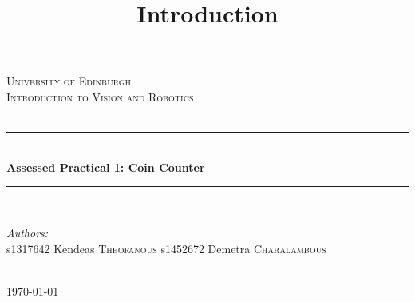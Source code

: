 \documentclass[11pt]{article}
\begin{document}
\begin{titlepage}

\newcommand{\HRule}{\rule{\linewidth}{0.5mm}} %

\center %
 

\textsc{\LARGE University of Edinburgh}\\[1.5cm] %
\textsc{\Large Introduction to Vision and Robotics}\\[0.5cm] %
\textsc{\large }\\[0.5cm] %


\HRule \\[0.4cm]
{ \huge \bfseries Assessed Practical 1: Coin Counter}\\[0.4cm] %
\HRule \\[1.5cm]
 

\begin{minipage}{0.5\textwidth}
\begin{flushleft} \large
\emph{Authors:}\\
s1317642 Kendeas \textsc{Theofanous}
s1452672 Demetra \textsc{Charalambous}
\end{flushleft}
\end{minipage}\\[3cm]

{\large \today}\\[3cm]

\end{titlepage}

\newpage

\title{Introduction} \setlength{\droptitle}{-70pt}
\date{\vspace{-10ex}}
\maketitle
\end{document}
